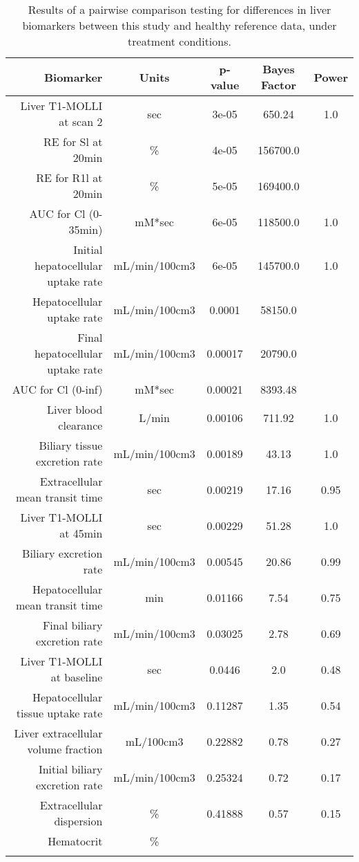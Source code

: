 \documentclass{epflreport}%
\begin{document}
%
\begin{longtable}{rcccc}%
\hline%
Biomarker&Units&p{-}value&Bayes Factor&Power\\%
\hline%
Liver T1{-}MOLLI at scan 2&sec&3e{-}05&650.24&1.0\\%
RE for Sl at 20min&\%&4e{-}05&156700.0&\\%
RE for R1l at 20min&\%&5e{-}05&169400.0&\\%
AUC for Cl (0{-}35min)&mM*sec&6e{-}05&118500.0&1.0\\%
Initial hepatocellular uptake rate&mL/min/100cm3&6e{-}05&145700.0&1.0\\%
Hepatocellular uptake rate&mL/min/100cm3&0.0001&58150.0&\\%
Final hepatocellular uptake rate&mL/min/100cm3&0.00017&20790.0&\\%
AUC for Cl (0{-}inf)&mM*sec&0.00021&8393.48&\\%
Liver blood clearance&L/min&0.00106&711.92&1.0\\%
Biliary tissue excretion rate&mL/min/100cm3&0.00189&43.13&1.0\\%
Extracellular mean transit time&sec&0.00219&17.16&0.95\\%
Liver T1{-}MOLLI at 45min&sec&0.00229&51.28&1.0\\%
Biliary excretion rate&mL/min/100cm3&0.00545&20.86&0.99\\%
Hepatocellular mean transit time&min&0.01166&7.54&0.75\\%
Final biliary excretion rate&mL/min/100cm3&0.03025&2.78&0.69\\%
Liver T1{-}MOLLI at baseline&sec&0.0446&2.0&0.48\\%
Hepatocellular tissue uptake rate&mL/min/100cm3&0.11287&1.35&0.54\\%
Liver extracellular volume fraction&mL/100cm3&0.22882&0.78&0.27\\%
Initial biliary excretion rate&mL/min/100cm3&0.25324&0.72&0.17\\%
Extracellular dispersion&\%&0.41888&0.57&0.15\\%
Hematocrit&\%&&&\\%
\hline%
\caption{Results of a pairwise comparison testing for differences in liver biomarkers between this study and healthy reference data, under treatment conditions.} \\%
\end{longtable}%
\end{document}
